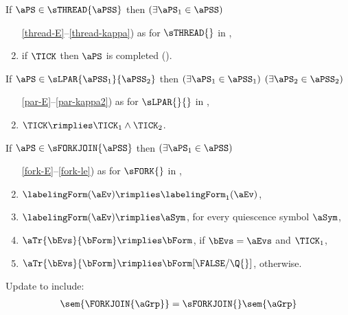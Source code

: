 \begin{definition}%
  \label{def:pomsets-fj}
  \noindent
  If $\aPS \in \sTHREAD{\aPSS}$ then $(\exists\aPS_1\in\aPSS)$
  \begin{enumerate}
  \item[\ref{thread-E}--\ref{thread-kappa})] as for $\sTHREAD{}$ in , %
    
  \item %
    if $\TICK$ then $\aPS$ is completed ().
  \end{enumerate}

  \noindent
  If $\aPS \in \sLPAR{\aPSS_1}{\aPSS_2}$ then $(\exists\aPS_1\in\aPSS_1)$
  $(\exists\aPS_2\in\aPSS_2)$
  \begin{enumerate}
  \item[\ref{par-E}--\ref{par-kappa2})] as for $\sLPAR{}{}$ in
    ,
  \item \label{par-tick} $\TICK \rimplies \TICK_1\land\TICK_2$.
  \end{enumerate}

  \noindent
  If $\aPS \in \sFORKJOIN{\aPSS}$ then $(\exists\aPS_1\in\aPSS)$
  \begin{enumerate}
  \item[\ref{fork-E}--\ref{fork-le})] as for $\sFORK{}$ in ,
  \item
    $\labelingForm(\aEv) \rimplies \labelingForm_1(\aEv)$,    
  \item 
    $\labelingForm(\aEv) \rimplies \aSym$, for every quiescence symbol $\aSym$,
  \item
    $\aTr{\bEvs}{\bForm} \rimplies \bForm$, if $\bEvs=\aEvs$ and $\TICK_1$,
  \item %
    $\aTr{\bEvs}{\bForm} \rimplies \bForm[\FALSE/\Q{}]$, otherwise.
  \end{enumerate}
\end{definition}
\begin{definition}
  Update  to include:
  \begin{align*}
    \sem{\FORKJOIN{\aGrp}} = \sFORKJOIN{}\sem{\aGrp}  
  \end{align*}
\end{definition}

